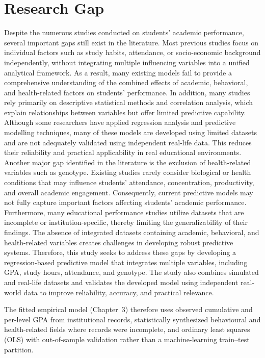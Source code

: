 \documentclass[12pt]{report}
\begin{document}
	\section{Research Gap}
	Despite the numerous studies conducted on students’ academic performance, several important gaps still exist in the literature. Most previous studies focus on individual factors such as study habits, attendance, or socio-economic background independently, without integrating multiple influencing variables into a unified analytical framework. As a result, many existing models fail to provide a comprehensive understanding of the combined effects of academic, behavioral, and health-related factors on students’ performance.
	In addition, many studies rely primarily on descriptive statistical methods and correlation analysis, which explain relationships between variables but offer limited predictive capability. Although some researchers have applied regression analysis and predictive modelling techniques, many of these models are developed using limited datasets and are not adequately validated using independent real-life data. This reduces their reliability and practical applicability in real educational environments.
	Another major gap identified in the literature is the exclusion of health-related variables such as genotype. Existing studies rarely consider biological or health conditions that may influence students’ attendance, concentration, productivity, and overall academic engagement. Consequently, current predictive models may not fully capture important factors affecting students’ academic performance.
	Furthermore, many educational performance studies utilize datasets that are incomplete or institution-specific, thereby limiting the generalizability of their findings. The absence of integrated datasets containing academic, behavioral, and health-related variables creates challenges in developing robust predictive systems.
	Therefore, this study seeks to address these gaps by developing a regression-based predictive model that integrates multiple variables, including GPA, study hours, attendance, and genotype. The study also combines simulated and real-life datasets and validates the developed model using independent real-world data to improve reliability, accuracy, and practical relevance.
	
	The fitted empirical model (Chapter~3) therefore uses observed cumulative and per-level GPA from institutional records, statistically synthesized behavioural and health-related fields where records were incomplete, and ordinary least squares (OLS) with out-of-sample validation rather than a machine-learning train--test partition.
	
\end{document}

